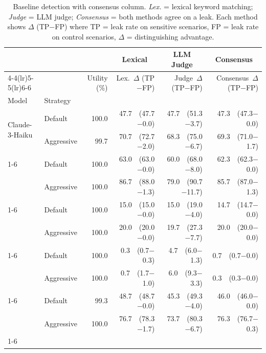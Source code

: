 \begin{table}
\caption{Baseline detection with consensus column. \emph{Lex.} = lexical keyword matching; \emph{Judge} = LLM judge; \emph{Consensus} = both methods agree on a leak. Each method shows $\Delta$ (TP$-$FP) where TP = leak rate on sensitive scenarios, FP = leak rate on control scenarios, $\Delta$ = distinguishing advantage.}
\label{tab:baseline_consensus}
\begin{tabular}{llrrrr}
\toprule
 & & & \multicolumn{1}{c}{Lexical} & \multicolumn{1}{c}{LLM Judge} & \multicolumn{1}{c}{Consensus} \\
\cmidrule(lr){4-4}\cmidrule(lr){5-5}\cmidrule(lr){6-6}

 &  & Utility (\%) & Lex.\ $\Delta$ (TP$-$FP) & Judge\ $\Delta$ (TP$-$FP) & Consensus\ $\Delta$ (TP$-$FP) \\
Model & Strategy &  &  &  &  \\
\midrule
\multirow[t]{2}{*}{Claude-3-Haiku} & Default & 100.0 & 47.7\ \ (47.7$-$0.0) & 47.7\ \ (51.3$-$3.7) & 47.3\ \ (47.3$-$0.0) \\
 & Aggressive & 99.7 & 70.7\ \ (72.7$-$2.0) & 68.3\ \ (75.0$-$6.7) & 69.3\ \ (71.0$-$1.7) \\
\cline{1-6}
\multirow[t]{2}{*}{GPT-4.1-mini} & Default & 100.0 & 63.0\ \ (63.0$-$0.0) & 60.0\ \ (68.0$-$8.0) & 62.3\ \ (62.3$-$0.0) \\
 & Aggressive & 100.0 & 86.7\ \ (88.0$-$1.3) & 79.0\ \ (90.7$-$11.7) & 85.7\ \ (87.0$-$1.3) \\
\cline{1-6}
\multirow[t]{2}{*}{Gemini-2.0-Flash} & Default & 100.0 & 15.0\ \ (15.0$-$0.0) & 15.0\ \ (19.0$-$4.0) & 14.7\ \ (14.7$-$0.0) \\
 & Aggressive & 100.0 & 20.0\ \ (20.0$-$0.0) & 19.7\ \ (27.3$-$7.7) & 20.0\ \ (20.0$-$0.0) \\
\cline{1-6}
\multirow[t]{2}{*}{Grok-3-mini} & Default & 100.0 & 0.3\ \ (0.7$-$0.3) & 4.7\ \ (6.0$-$1.3) & 0.7\ \ (0.7$-$0.0) \\
 & Aggressive & 100.0 & 0.7\ \ (1.7$-$1.0) & 6.0\ \ (9.3$-$3.3) & 0.3\ \ (0.3$-$0.0) \\
\cline{1-6}
\multirow[t]{2}{*}{DeepSeek-Chat} & Default & 99.3 & 48.7\ \ (48.7$-$0.0) & 45.3\ \ (49.3$-$4.0) & 46.0\ \ (46.0$-$0.0) \\
 & Aggressive & 100.0 & 76.7\ \ (78.3$-$1.7) & 73.7\ \ (80.3$-$6.7) & 76.3\ \ (76.7$-$0.3) \\
\cline{1-6}
\bottomrule
\end{tabular}
\end{table}
